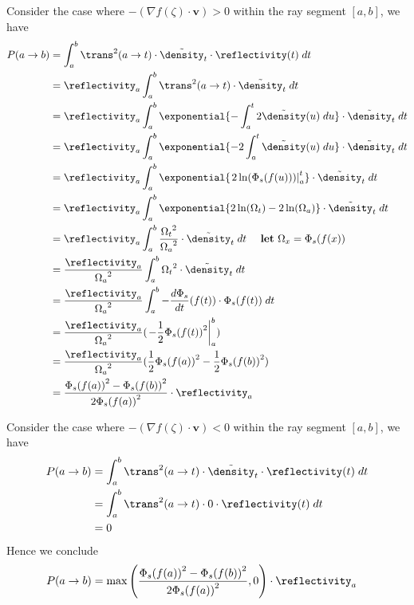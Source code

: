 Consider the case where $-(\nabla f(\zeta)\cdot \mathbf{v})>0$ within the ray segment $[a,b]$, we have
\begin{align}
P(a \rightarrow b)
&= \int_a^b \trans^2(a\rightarrow t) \cdot \tilde{\density}_t \cdot \reflectivity(t)  \; dt
\\
&= \reflectivity_a \int_a^b \trans^2(a\rightarrow t) \cdot \tilde{\density}_t \; dt
\\
&= \reflectivity_a \int_a^b \exponential{-\int_a^t 2\tilde{\density}(u) \; du} \cdot \tilde{\density}_t \; dt
\\
&= \reflectivity_a \int_a^b \exponential{-2\int_a^t \tilde{\density}(u) \; du} \cdot \tilde{\density}_t \; dt
\\
&= \reflectivity_a \int_a^b \exponential{\left. 2\ln(\Phi_s(f(u)))\right|_a^t} \cdot \tilde{\density}_t \; dt
\\
&= \reflectivity_a \int_a^b \exponential{2\ln(\Omega_t) - 2\ln(\Omega_a)} \cdot \tilde{\density}_t \; dt 
\\
&= \reflectivity_a \int_a^b \frac{{\Omega_t}^2}{{\Omega_a}^2} \cdot \tilde{\density}_t \; dt ~~~~\text{\textbf{let} $\Omega_x = \Phi_s(f(x))$}
\\
&= \frac{\reflectivity_a}{{\Omega_a}^2} \int_a^b {\Omega_t}^2 \cdot \tilde{\density}_t \; dt 
\\
&= \frac{\reflectivity_a}{{\Omega_a}^2} \int_a^b -\frac{d\Phi_s}{dt}(f(t)) \cdot \Phi_s(f(t)) \; dt 
\\
&= \frac{\reflectivity_a}{{\Omega_a}^2} ( \left. -\frac{1}{2}{\Phi_s(f(t))}^2 \right|_a^b) \\
&= \frac{\reflectivity_a}{{\Omega_a}^2} (\frac{1}{2}{\Phi_s(f(a))}^2 -\frac{1}{2}{\Phi_s(f(b))}^2 )\\
&= \frac{{\Phi_s(f(a))}^2 -{\Phi_s(f(b))}^2}{{2\Phi_s(f(a))}^2} \cdot \reflectivity_a 
\label{eq:homogeneous}
\end{align}

Consider the case where $-(\nabla f(\zeta)\cdot \mathbf{v})<0$ within the ray segment $[a,b]$, we have
\begin{align}
P(a \rightarrow b)
&= \int_a^b \trans^2(a\rightarrow t) \cdot \tilde{\density}_t \cdot \reflectivity(t)  \; dt
\\
&= \int_a^b \trans^2(a\rightarrow t) \cdot 0 \cdot \reflectivity(t)  \; dt
\\
&= 0
\end{align}
Hence we conclude 
\begin{align}
P(a \rightarrow b)
&= \max\left(\frac{{\Phi_s(f(a))}^2 -{\Phi_s(f(b))}^2}{{2\Phi_s(f(a))}^2},0\right) \cdot \reflectivity_a 
\end{align}

